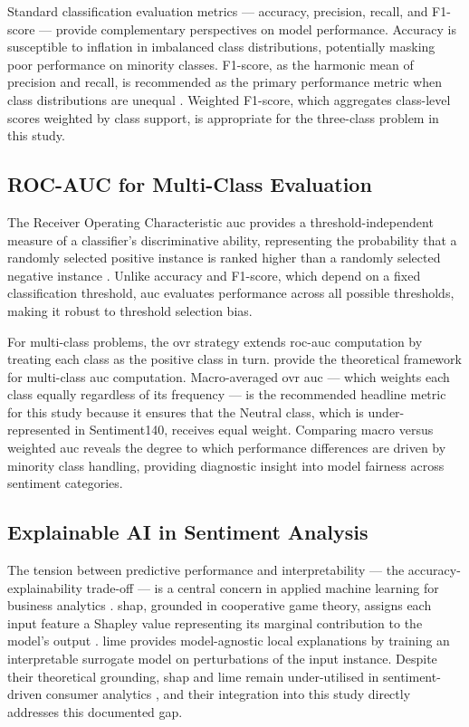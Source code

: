 Standard classification evaluation metrics --- accuracy, precision, recall, and F1-score --- provide complementary perspectives on model performance. Accuracy is susceptible to inflation in imbalanced class distributions, potentially masking poor performance on minority classes. F1-score, as the harmonic mean of precision and recall, is recommended as the primary performance metric when class distributions are unequal \citep{powers2011evaluation}. Weighted F1-score, which aggregates class-level scores weighted by class support, is appropriate for the three-class problem in this study.

\subsection{ROC-AUC for Multi-Class Evaluation}

The Receiver Operating Characteristic \gls{auc} provides a threshold-independent measure of a classifier's discriminative ability, representing the probability that a randomly selected positive instance is ranked higher than a randomly selected negative instance \citep{fawcett2006introduction}. Unlike accuracy and F1-score, which depend on a fixed classification threshold, \gls{auc} evaluates performance across all possible thresholds, making it robust to threshold selection bias.

For multi-class problems, the \gls{ovr} strategy extends \gls{roc}-\gls{auc} computation by treating each class as the positive class in turn. \citet{hand2001simple} provide the theoretical framework for multi-class \gls{auc} computation. Macro-averaged \gls{ovr} \gls{auc} --- which weights each class equally regardless of its frequency --- is the recommended headline metric for this study because it ensures that the Neutral class, which is under-represented in Sentiment140, receives equal weight. Comparing macro versus weighted \gls{auc} reveals the degree to which performance differences are driven by minority class handling, providing diagnostic insight into model fairness across sentiment categories.

\subsection{Explainable AI in Sentiment Analysis}

The tension between predictive performance and interpretability --- the accuracy-explainability trade-off --- is a central concern in applied machine learning for business analytics \citep{rudin2019stop}. \gls{shap}, grounded in cooperative game theory, assigns each input feature a Shapley value representing its marginal contribution to the model's output \citep{lundberg2017unified}. \gls{lime} \citep{ribeiro2016should} provides model-agnostic local explanations by training an interpretable surrogate model on perturbations of the input instance. Despite their theoretical grounding, \gls{shap} and \gls{lime} remain under-utilised in sentiment-driven consumer analytics \citep{danilevsky2020survey}, and their integration into this study directly addresses this documented gap.

